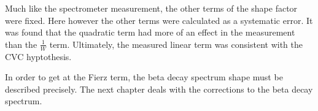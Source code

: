 \documentclass[main.tex]{subfiles}
\begin{document}
Much like the spectrometer measurement, the other terms of the shape factor were fixed.
Here however the other terms were calculated as a systematic error.
It was found that the quadratic term had more of an effect in the measurement than the $\frac{1}{W}$ term.
Ultimately, the measured linear term was consistent with the CVC hyptothesis. 

In order to get at the Fierz term, the beta decay spectrum shape must be described precisely.
The next chapter deals with the corrections to the beta decay spectrum.  
\end{document}
